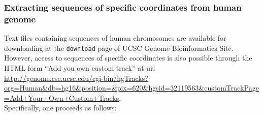 \documentclass[notitlepage,11pt]{article}
\begin{document}
\subsubsection{Extracting sequences of specific coordinates from human genome}
Text files containing sequences of human chromosomes are available for downloading at the \texttt{download} page of UCSC Genome Bioinformatics Site. 
However, access to sequences of  specific coordinates is also possible through the HTML form ``Add you own custom track'' at url\\
\url{http://genome.cse.ucsc.edu/cgi-bin/hgTracks?org=Human&db=hg16&position=&pix=620&hgsid=32119563&customTrackPage=Add+Your+Own+Custom+Tracks}.\\

\noindent Specifically, one proceeds as follows:
\end{document}
